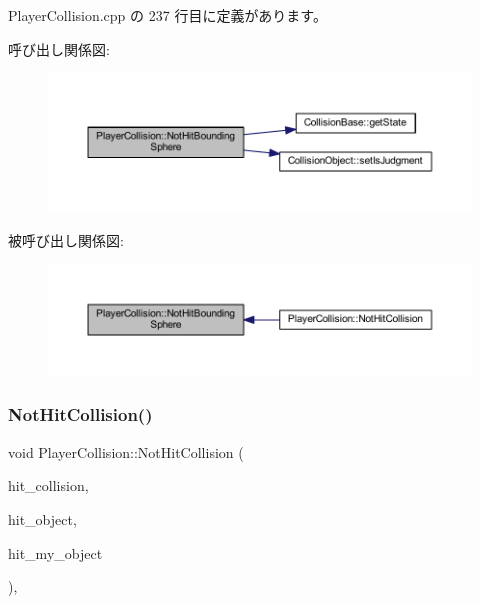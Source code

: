  Player\+Collision.\+cpp の 237 行目に定義があります。

呼び出し関係図\+:\nopagebreak
\begin{figure}[H]
\begin{center}
\leavevmode
\includegraphics[width=350pt]{class_player_collision_adce9e2df2361cadba7bbe397810a1893_cgraph}
\end{center}
\end{figure}
被呼び出し関係図\+:\nopagebreak
\begin{figure}[H]
\begin{center}
\leavevmode
\includegraphics[width=350pt]{class_player_collision_adce9e2df2361cadba7bbe397810a1893_icgraph}
\end{center}
\end{figure}
\mbox{\label{class_player_collision_a21b8f825ea142024212ab5fe3f427ab0}} 
\subsubsection{\texorpdfstring{Not\+Hit\+Collision()}{NotHitCollision()}}
{\footnotesize\ttfamily void Player\+Collision\+::\+Not\+Hit\+Collision (\begin{DoxyParamCaption}\item[{\mbox{\hyperlink{class_collision_base}{Collision\+Base}} $\ast$}]{hit\+\_\+collision,  }\item[{\mbox{\hyperlink{class_collision_object}{Collision\+Object}} $\ast$}]{hit\+\_\+object,  }\item[{\mbox{\hyperlink{class_collision_object}{Collision\+Object}} $\ast$}]{hit\+\_\+my\+\_\+object }\end{DoxyParamCaption})\hspace{0.3cm}{\ttfamily [override]}, {\ttfamily [virtual]}}




